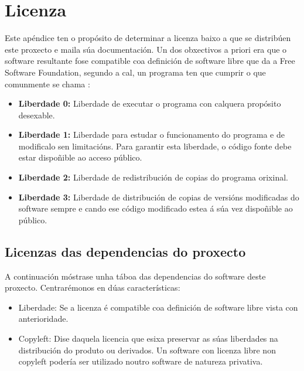 \chapter[Apéndice: Licenza]{
  \label{chp:licenza}
  Licenza
}

Este apéndice ten o propósito de determinar a licenza baixo a que se distribúen este proxecto e maila súa documentación. Un dos obxectivos a priori era que o software resultante fose compatible coa definición de software libre que da a Free Software Foundation, segundo a cal, un programa ten que cumprir o que comunmente se chama \cite{licenza}:

\begin{itemize}
	\item \textbf{Liberdade 0:} Liberdade de executar o programa con calquera propósito desexable.
	\item \textbf{Liberdade 1:} Liberdade para estudar o funcionamento do programa e de modificalo sen limitacións. Para garantir esta liberdade, o código fonte debe estar dispoñible ao acceso público.
	\item \textbf{Liberdade 2:} Liberdade de redistribución de copias do programa orixinal. 
	\item \textbf{Liberdade 3:} Liberdade de distribución de copias de versións modificadas do software sempre e cando ese código modificado estea á súa vez dispoñible ao público.
\end{itemize} 

\section{Licenzas das dependencias do proxecto}

A continuación móstrase unha táboa das dependencias do software deste proxecto. Centrarémonos en dúas características:

\begin{itemize}
	\item Liberdade: Se a licenza é compatible coa definición de software libre vista con anterioridade.
	\item Copyleft: Dise daquela licencia que esixa preservar as súas liberdades na distribución do produto ou derivados. Un software con licenza libre non copyleft podería ser utilizado noutro software de natureza privativa.
\end{itemize} 
\break


